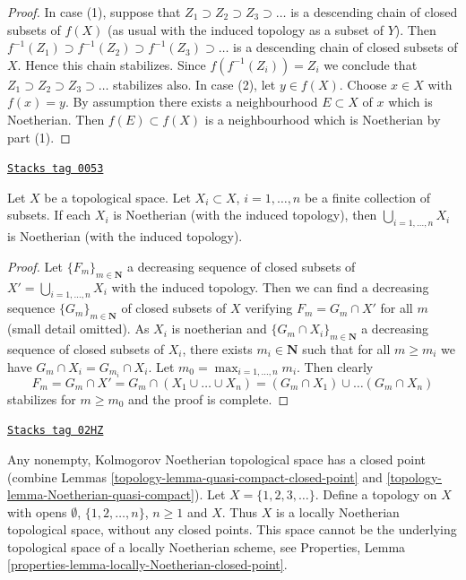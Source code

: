 \begin{proof}
In case (1), suppose that $Z_1 \supset Z_2 \supset Z_3 \supset \ldots$
is a descending chain of closed subsets of $f(X)$ (as usual with the induced
topology as a subset of $Y$). Then
$f^{-1}(Z_1) \supset f^{-1}(Z_2) \supset f^{-1}(Z_3) \supset \ldots$ is
a descending chain of closed subsets of $X$. Hence this chain stabilizes.
Since $f(f^{-1}(Z_i)) = Z_i$ we conclude that
$Z_1 \supset Z_2 \supset Z_3 \supset \ldots$
stabilizes also. In case (2), let $y \in f(X)$. Choose $x \in X$ with
$f(x) = y$. By assumption there exists a neighbourhood $E \subset X$ of
$x$ which is Noetherian. Then $f(E) \subset f(X)$ is a neighbourhood
which is Noetherian by part (1).
\end{proof}

\begin{lemma}
\label{topology-lemma-finite-union-Noetherian}
\href{https://stacks.math.columbia.edu/tag/0053}{\texttt{Stacks tag 0053}}

Let $X$ be a topological space.
Let $X_i \subset X$, $i = 1, \ldots, n$ be a finite collection of subsets.
If each $X_i$ is Noetherian (with the induced topology), then
$\bigcup_{i = 1, \ldots, n}  X_i$ is Noetherian (with the induced topology).
\end{lemma}

\begin{proof}
Let $\{F_m\}_{m \in \mathbf{N}}$ a decreasing sequence of closed subsets
of $X' = \bigcup_{i = 1, \ldots, n}  X_i$ with the induced topology.
Then we can find a decreasing sequence $\{G_m\}_{m \in \mathbf{N}}$
of closed subsets of $X$ verifying $F_m = G_m \cap X'$ for all $m$
(small detail omitted). As $X_i$ is noetherian and
$\{G_m \cap X_i\}_{m \in \mathbf{N}}$ a decreasing sequence
of closed subsets of $X_i$, there exists $m_i \in \mathbf{N}$
such that for all $m \geq m_i$ we have $G_m \cap X_i = G_{m_i} \cap X_i$.
Let $m_0 = \max_{i = 1, \ldots, n} m_i$. Then clearly
$$
F_m = G_m \cap X' = G_m \cap (X_1 \cup \ldots \cup X_n) =
(G_m \cap X_1) \cup \ldots (G_m \cap X_n)
$$
stabilizes for $m \geq m_0$ and the proof is complete.
\end{proof}

\begin{example}
\label{topology-example-locally-Noetherian-no-closed-point}
\href{https://stacks.math.columbia.edu/tag/02HZ}{\texttt{Stacks tag 02HZ}}

Any nonempty, Kolmogorov Noetherian topological space has a closed point
(combine Lemmas \ref{topology-lemma-quasi-compact-closed-point} and
\ref{topology-lemma-Noetherian-quasi-compact}).
Let $X = \{1, 2, 3, \ldots \}$. Define a topology on $X$
with opens $\emptyset$, $\{1, 2, \ldots, n\}$, $n \geq 1$
and $X$. Thus $X$ is a locally Noetherian topological space,
without any closed points. This space cannot be the underlying
topological space of a locally Noetherian scheme, see
Properties, Lemma \ref{properties-lemma-locally-Noetherian-closed-point}.
\end{example}

